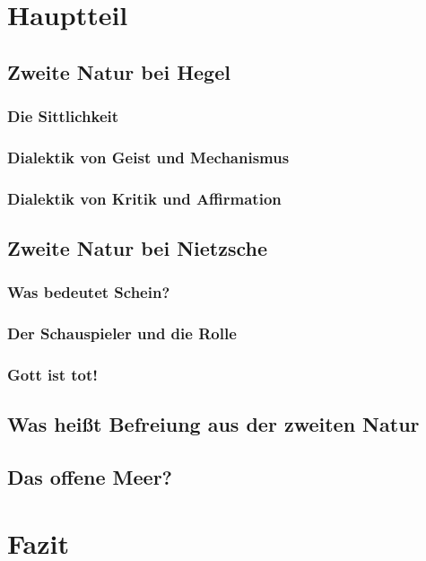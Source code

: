 \documentclass[12pt, a4paper, openany]{report}
\makeatletter
\newcommand\backmatter{ \if@openright \cleardoublepage \else \clearpage \fi }
\makeatother
\begin{document}
\chapter{Hauptteil}
\section{Zweite Natur bei Hegel}
\subsection{Die Sittlichkeit}
\subsection{Dialektik von Geist und Mechanismus}
\subsection{Dialektik von Kritik und Affirmation}
\section{Zweite Natur bei Nietzsche}
\subsection{Was bedeutet Schein?}
\subsection{Der Schauspieler und die Rolle}
\subsection{Gott ist tot!}
\section{Was heißt Befreiung aus der zweiten Natur}
\section{Das offene Meer?}

\chapter{Fazit}

\backmatter

\printbibliography
 
\end{document}
